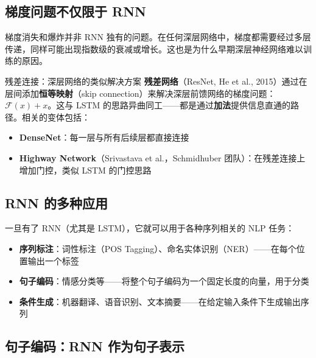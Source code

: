 \documentclass[a4paper]{article}
\begin{document}
\subsection{梯度问题不仅限于 RNN}





梯度消失和爆炸并非 RNN 独有的问题。在任何深层网络中，梯度都需要经过多层传递，同样可能出现指数级的衰减或增长。这也是为什么早期深层神经网络难以训练的原因。

\begin{knowledgebox}{残差连接：深层网络的类似解决方案}
\textbf{残差网络}（ResNet, He et al., 2015）通过在层间添加\textbf{恒等映射}（skip connection）来解决深层前馈网络的梯度问题：$\mathcal{F}(x) + x$。这与 LSTM 的思路异曲同工——都是通过\textbf{加法}提供信息直通的路径。相关的变体包括：
\begin{itemize}
    \item \textbf{DenseNet}：每一层与所有后续层都直接连接
    \item \textbf{Highway Network}（Srivastava et al.，Schmidhuber 团队）：在残差连接上增加门控，类似 LSTM 的门控思路
\end{itemize}
\end{knowledgebox}

\subsection{RNN 的多种应用}

一旦有了 RNN（尤其是 LSTM），它就可以用于各种序列相关的 NLP 任务：





\begin{itemize}
    \item \textbf{序列标注}：词性标注（POS Tagging）、命名实体识别（NER）——在每个位置输出一个标签
    \item \textbf{句子编码}：情感分类等——将整个句子编码为一个固定长度的向量，用于分类
    \item \textbf{条件生成}：机器翻译、语音识别、文本摘要——在给定输入条件下生成输出序列
\end{itemize}

\subsection{句子编码：RNN 作为句子表示}
\end{document}
